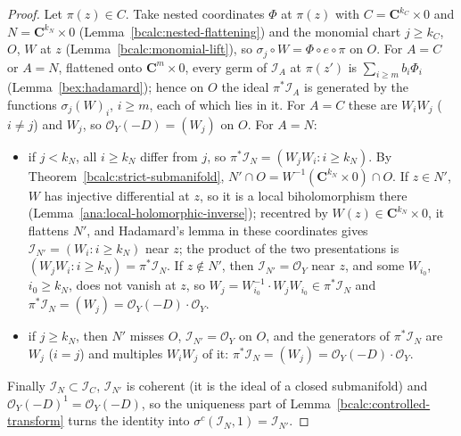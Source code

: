 \begin{proof}
Let \(\pi(z)\in C\). Take nested coordinates \(\Phi\) at \(\pi(z)\) with \(C=\mathbf C^{k_C}\times0\) and \(N=\mathbf C^{k_N}\times0\)
(Lemma~\ref{bcalc:nested-flattening}) and the monomial chart \(j\ge k_C\), \(O\), \(W\) at \(z\) (Lemma~\ref{bcalc:monomial-lift}), so
\(\sigma_j\circ W=\Phi\circ e\circ\pi\) on \(O\). For \(A=C\) or \(A=N\), flattened onto \(\mathbf C^{m}\times0\), every germ of
\(\mathcal I_A\) at \(\pi(z')\) is \(\sum_{i\ge m}b_i\Phi_i\) (Lemma~\ref{bex:hadamard}); hence on \(O\) the ideal \(\pi^*\mathcal I_A\) is
generated by the functions \(\sigma_j(W)_i\), \(i\ge m\), each of which lies in it. For \(A=C\) these are \(W_iW_j\) (\(i\ne j\)) and \(W_j\),
so \(\mathcal O_Y(-D)=(W_j)\) on \(O\). For \(A=N\):
\begin{itemize}
\item if \(j<k_N\), all \(i\ge k_N\) differ from \(j\), so \(\pi^*\mathcal I_N=(W_jW_i:i\ge k_N)\). By Theorem~\ref{bcalc:strict-submanifold},
\(N'\cap O=W^{-1}(\mathbf C^{k_N}\times0)\cap O\). If \(z\in N'\), \(W\) has injective differential at \(z\), so it is a local
biholomorphism there (Lemma~\ref{ana:local-holomorphic-inverse}); recentred by \(W(z)\in\mathbf C^{k_N}\times0\), it flattens \(N'\), and
Hadamard's lemma in these coordinates gives \(\mathcal I_{N'}=(W_i:i\ge k_N)\) near \(z\); the product of the two presentations is
\((W_jW_i:i\ge k_N)=\pi^*\mathcal I_N\). If \(z\notin N'\), then \(\mathcal I_{N'}=\mathcal O_Y\) near \(z\), and some \(W_{i_0}\), \(i_0\ge k_N\),
does not vanish at \(z\), so \(W_j=W_{i_0}^{-1}\cdot W_jW_{i_0}\in\pi^*\mathcal I_N\) and \(\pi^*\mathcal I_N=(W_j)=\mathcal O_Y(-D)\cdot\mathcal O_Y\).
\item if \(j\ge k_N\), then \(N'\) misses \(O\), \(\mathcal I_{N'}=\mathcal O_Y\) on \(O\), and the generators of \(\pi^*\mathcal I_N\) are
\(W_j\) (\(i=j\)) and multiples \(W_iW_j\) of it: \(\pi^*\mathcal I_N=(W_j)=\mathcal O_Y(-D)\cdot\mathcal O_Y\).
\end{itemize}
Finally \(\mathcal I_N\subset\mathcal I_C\), \(\mathcal I_{N'}\) is coherent (it is the ideal of a closed submanifold) and
\(\mathcal O_Y(-D)^1=\mathcal O_Y(-D)\), so the uniqueness part of Lemma~\ref{bcalc:controlled-transform} turns the identity into
\(\sigma^{c}(\mathcal I_N,1)=\mathcal I_{N'}\).
\end{proof}

